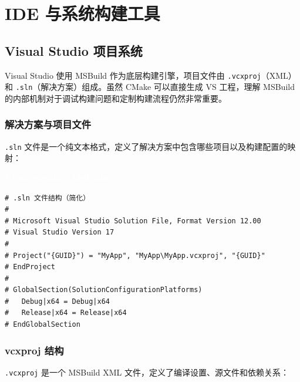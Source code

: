 \documentclass[12pt,a4paper,fontset=fandol]{ctexbook}
\newcommand{\Tp}[1]{\texttt{#1}}
\newcommand{\vslabel}{%
  \noindent\begin{tcolorbox}[sharp corners,colback=vsheadbg,colframe=vsheadbg,
    left=6pt,right=6pt,top=2pt,bottom=2pt,boxrule=0pt]
  \textcolor{white}{\small\bfseries\sffamily Visual Studio / MSBuild}\end{tcolorbox}%
}
\begin{document}
\part{IDE 与系统构建工具}

\chapter{Visual Studio 项目系统}

Visual Studio 使用 MSBuild 作为底层构建引擎，项目文件由 \Tp{.vcxproj}（XML）和 \Tp{.sln}（解决方案）组成。虽然 CMake 可以直接生成 VS 工程，理解 MSBuild 的内部机制对于调试构建问题和定制构建流程仍然非常重要。

\section{解决方案与项目文件}

\Tp{.sln} 文件是一个纯文本格式，定义了解决方案中包含哪些项目以及构建配置的映射：

\vslabel
\begin{lstlisting}[style=bashstyle]
# .sln 文件结构（简化）
#
# Microsoft Visual Studio Solution File, Format Version 12.00
# Visual Studio Version 17
#
# Project("{GUID}") = "MyApp", "MyApp\MyApp.vcxproj", "{GUID}"
# EndProject
#
# GlobalSection(SolutionConfigurationPlatforms)
#   Debug|x64 = Debug|x64
#   Release|x64 = Release|x64
# EndGlobalSection
\end{lstlisting}

\section{vcxproj 结构}

\Tp{.vcxproj} 是一个 MSBuild XML 文件，定义了编译设置、源文件和依赖关系：
\end{document}
